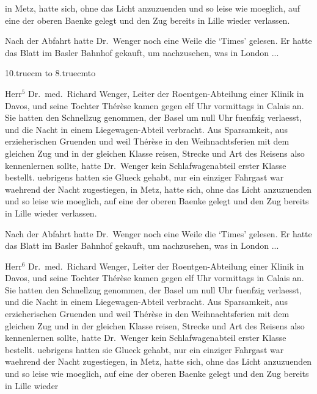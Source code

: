 in Metz, hatte sich, ohne das Licht anzuzuenden
und so leise wie moeglich, auf eine der oberen
Baenke gelegt und den Zug bereits in Lille wieder
verlassen.\par
Nach der Abfahrt hatte Dr.~Wen\-ger noch eine
Weile die `Times' gelesen. Er hatte das Blatt im
Basler Bahnhof gekauft, um nachzusehen, was in London ...\par
\begin{floatingfigure}{10.truecm}%
\vbox to 8.truecm{\vfil\hbox to \vfil}%
\caption[anderer Abb.text]
  {Hier steht ausnahmsweise 
   mal ein anderer Abbildungstext;
   man wird sehen wie {\TeX} damit zurecht kommen wird.}
\end{floatingfigure}
Herr$^{5}$ Dr.~med.~Richard Wenger, Leiter der Roent\-gen-Ab\-tei\-lung
einer Klinik in Davos, und seine
Tochter Th\'e\-r\`ese kamen gegen elf Uhr vormittags
in Calais an. Sie hatten den Schnellzug genommen,
der Basel um null Uhr fuenfzig verlaesst, und die
Nacht in einem Liege\-wagen-Abteil verbracht.
Aus Sparsamkeit, aus erzieherischen
Gruenden und weil
Th\'e\-r\`ese in den Weihnachtsferien mit dem gleichen
Zug und in der gleichen Klasse reisen, Strecke und
Art des Reisens also kennenlernen sollte, hatte Dr.~Wenger
kein Schlafwagenabteil erster Klasse bestellt.
uebrigens hatten sie Glueck gehabt, nur ein
einziger Fahrgast war waehrend der Nacht zugestiegen,
in Metz, hatte sich, ohne das Licht anzuzuenden
und so leise wie moeglich, auf eine der oberen
Baenke gelegt und den Zug bereits in Lille wieder
verlassen.\par
Nach der Abfahrt hatte Dr.~Wen\-ger noch eine
Weile die `Times' gelesen. Er hatte das Blatt im
Basler Bahnhof gekauft, um nachzusehen, was in London ...\par
Herr$^{6}$ Dr.~med.~Richard Wenger, Leiter der Roent\-gen-Ab\-tei\-lung
einer Klinik in Davos, und seine
Tochter Th\'e\-r\`ese kamen gegen elf Uhr vormittags
in Calais an. Sie hatten den Schnellzug genommen,
der Basel um null Uhr fuenfzig verlaesst, und die
Nacht in einem Liege\-wagen-Abteil verbracht.
Aus Sparsamkeit, aus erzieherischen
Gruenden und weil
Th\'e\-r\`ese in den Weihnachtsferien mit dem gleichen
Zug und in der gleichen Klasse reisen, Strecke und
Art des Reisens also kennenlernen sollte, hatte Dr.~Wenger
kein Schlafwagenabteil erster Klasse bestellt.
uebrigens hatten sie Glueck gehabt, nur ein
einziger Fahrgast war waehrend der Nacht zugestiegen,
in Metz, hatte sich, ohne das Licht anzuzuenden
und so leise wie moeglich, auf eine der oberen
Baenke gelegt und den Zug bereits in Lille wieder
